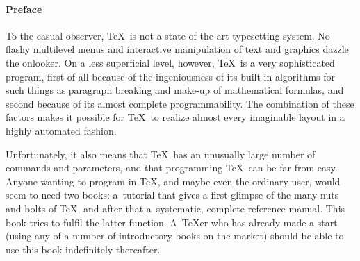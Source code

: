 \documentclass[twoside,letterpaper,openright]{rapport3}
\begin{document}
\pagebreak
\mark{}

\paragraph*{\bf Preface}
To the casual observer, \TeX\
is not a state-of-the-art typesetting system.
No flashy multilevel menus and interactive manipulation
of text and graphics dazzle the onlooker.
On a less superficial level, however, \TeX\ is a very sophisticated
program, first of all because of the ingeniousness of its
built-in algorithms for such things as paragraph breaking
and make-up of mathematical formulas, and
second because of its almost complete programmability.
The combination of these factors makes it possible for \TeX\
to realize almost every imaginable layout in a highly automated
fashion.

Unfortunately, it also means that \TeX\ has an
unusually large number of commands and parameters,
and that programming \TeX\ can be far from easy.
Anyone wanting to program in \TeX, and maybe
even the ordinary user, would seem to need two books:
a~tutorial that gives a first glimpse of the many
nuts and bolts of \TeX, and after that
a~systematic, complete reference manual.
This book tries to fulfil the latter function.
A~\TeX er who has already made a start
(using any of a number of introductory books
on the market)
should be able to use this book indefinitely thereafter.
\end{document}
